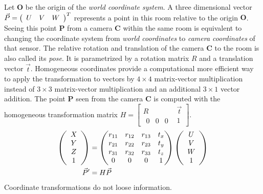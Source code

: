 Let $\mathbf{O}$ be the origin of the \emph{world coordinate system}.
A three dimensional vector $\vec{P} = \left(\begin{array}{ccc} U & V & W \end{array}\right)^T$ represents a point in this room relative to the origin $\mathbf{O}$.
Seeing this point $\mathbf{P}$ from a camera $\mathbf{C}$ within the same room is equivalent to changing the coordinate system from \emph{world coordinates} to \emph{camera coordinates} of that sensor.
The relative rotation and translation of the camera $\mathbf{C}$ to the room is also called its \emph{pose}.
It is parametrized by a rotation matrix $R$ and a translation vector $\vec{t}$.
Homogeneous coordinates provide a computational more efficient way to apply the transformation to vectors by $4 \times 4$ matrix-vector multiplication instead of $3 \times 3$ matrix-vector multiplication and an additional $3 \times 1$ vector addition.
The point $\mathbf{P}$ seen from the camera $\mathbf{C}$ is computed with the homogeneous transformation matrix $H = \begin{bmatrix} R & \vec{t} \\ 
    \begin{matrix}0 & 0 & 0\end{matrix} & 1 \end{bmatrix}$.
\begin{equation}
\begin{aligned}
    \left(\begin{array}{c} X \\ Y \\ Z \\ 1\end{array}\right)&= \begin{pmatrix}
        r_{11} & r_{12} & r_{13} & t_x \\
        r_{21} & r_{22} & r_{23} & t_y \\
        r_{31} & r_{32} & r_{33} & t_z \\
        0      & 0      & 0      & 1 \\
    \end{pmatrix} \left(\begin{array}{c} U \\ V \\ W \\ 1\end{array}\right) \\
    \vec{P}' &= H \vec{P}
\end{aligned}
\end{equation}
Coordinate transformations do not loose information.
